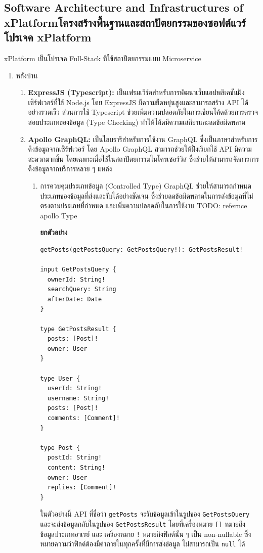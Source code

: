 \subsection{\ifenglish Software Architecture and Infrastructures of xPlatform\else โครงสร้างพื้นฐานและสถาปัตยกรรมของซอฟต์แวร์โปรเจค xPlatform\fi}
xPlatform เป็นโปรเจค Full-Stack ที่ใช้สถาปัตยกรรมแบบ Microservice
\begin{enumerate}
    \item หลังบ้าน
    \begin{enumerate}
        \item \textbf{ExpressJS (Typescript):} เป็นเฟรมเวิร์คสำหรับการพัฒนาเว็บแอปพลิเคชันฝั่งเซิร์ฟเวอร์ที่ใช้ Node.js โดย ExpressJS มีความยืดหยุ่นสูงและสามารถสร้าง API ได้อย่างรวดเร็ว ส่วนการใช้ Typescript ช่วยเพิ่มความปลอดภัยในการเขียนโค้ดด้วยการตรวจสอบประเภทของข้อมูล (Type Checking) ทำให้โค้ดมีความเสถียรและลดข้อผิดพลาด
        \item \textbf{Apollo GraphQL:} เป็นไลบรารีสำหรับการใช้งาน GraphQL ซึ่งเป็นภาษาสำหรับการดึงข้อมูลจากเซิร์ฟเวอร์ โดย Apollo GraphQL สามารถช่วยให้ฝั่งเรียกใช้ API มีความสะดวกมากขึ้น โดยเฉพาะเมื่อใช้ในสถาปัตยกรรมไมโครเซอร์วิส ซึ่งช่วยให้สามารถจัดการการดึงข้อมูลจากบริการหลาย ๆ แหล่ง
        \begin{enumerate}
            \item การควบคุมประเภทข้อมูล (Controlled Type) GraphQL ช่วยให้สามารถกำหนดประเภทของข้อมูลที่ส่งและรับได้อย่างชัดเจน ซึ่งช่วยลดข้อผิดพลาดในการส่งข้อมูลที่ไม่ตรงตามประเภทที่กำหนด และเพิ่มความปลอดภัยในการใช้งาน TODO: refernce apollo Type
            
            \textbf{ยกตัวอย่าง}
            \begin{center}                
                \begin{lstlisting}
getPosts(getPostsQuery: GetPostsQuery!): GetPostsResult!

input GetPostsQuery {
  ownerId: String!
  searchQuery: String
  afterDate: Date
}

type GetPostsResult {
  posts: [Post]!
  owner: User
}

type User {
  userId: String!
  username: String!
  posts: [Post]!
  comments: [Comment]!
}

type Post {
  postId: String!
  content: String!
  owner: User
  replies: [Comment]!
}
                \end{lstlisting}
            \end{center}
            ในตัวอย่างนี้ API ที่ชื่อว่า {\tt getPosts} จะรับข้อมูลเข้าในรูปของ {\tt GetPostsQuery} และจะส่งข้อมูลกลับในรูปของ {\tt GetPostsResult} โดยที่เครื่องหมาย \texttt{[]} หมายถึงข้อมูลประเภทอาเรย์ และ เครื่องหมาย \texttt{!} หมายถึงฟิลด์นั้น ๆ เป็น non-nullable ซึ่งหมายความว่าฟิลด์ต้องมีค่าภายในทุกครั้งที่มีการส่งข้อมูล ไม่สามารถเป็น \texttt{null} ได้


\end{enumerate}
\end{enumerate}
\end{enumerate}
